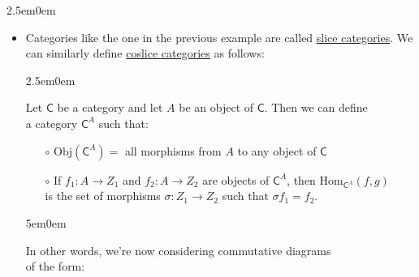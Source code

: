 \documentclass{book}
\newcommand{\exP}{%
   \color{VioletRed}%
   \fontsize{12}{14}\selectfont%
}
\newenvironment{myIndent}{%
   \begin{adjustwidth}{2.5em}{0em}%
}{%
   \end{adjustwidth}%
}
\newenvironment{myDindent}{%
   \begin{adjustwidth}{5em}{0em}%
}{%
   \end{adjustwidth}%
}
\newcommand{\myObj}{\mathrm{Obj}}
\newcommand{\myHom}{\mathrm{Hom}}
\newcommand{\mcateg}[1]{{\bm{\mathsf{#1}}}}
\newcommand{\retTwo}{\hfill\bigbreak}
\begin{document}
\begin{myIndent}
\begin{itemize}
         \item Categories like the one in the previous example are called \ul{slice categories}. We\\ can similarly define \ul{coslice categories} as follows:
         \begin{myIndent}
            Let $\mcateg{C}$ be a category and let $A$ be an object of $\mcateg{C}$. Then we can define\\ a category $\mcateg{C}^A$ such that:
            \begin{itemize}
               \item[$\circ$] $\myObj(\mcateg{C}^A) =$ all morphisms from $A$ to any object of $\mcateg{C}$
               \item[$\circ$] If $f_1: A \longrightarrow Z_1$ and $f_2: A \longrightarrow Z_2$ are objects of $\mcateg{C}^A$, then $\myHom_{\mcateg{C}^A}(f, g)$\\ is the set of morphisms $\sigma: Z_1 \rightarrow Z_2$ such that $\sigma f_1 = f_2$.
            \end{itemize}
            {\begin{myDindent}\exP
               In other words, we're now considering commutative diagrams\\ of the form:
               
               \begin{center}
               \end{center}

            \end{myDindent}}
         \end{myIndent}
      \end{itemize}
   \end{myIndent}\retTwo
\end{document}
